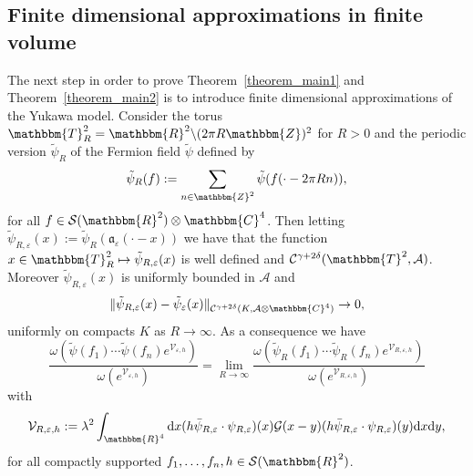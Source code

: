 \documentclass[11pt]{article}
\newcommand{\assign}{:=}
\newcommand{\mathd}{\mathrm{d}}
\begin{document}
\subsection{Finite dimensional approximations in finite
volume}\label{sec:finit-dim-yukawa}

The next step in order to prove Theorem~\ref{theorem_main1} and
Theorem~\ref{theorem_main2} is to introduce finite dimensional approximations
of the Yukawa model. Consider the torus $\mathbbm{T}_R^2 =\mathbbm{R}^2
\backslash (2 \pi R\mathbbm{Z})^2$ for $R > 0$ and the periodic version
$\tilde{\psi}_R$ of the Fermion field $\tilde{\psi}$ defined by
\[ \tilde{\psi}_R (f) \assign \sum_{n \in \mathbbm{Z}^2} \tilde{\psi} (f (\cdot
   - 2 \pi R n)), \]
for all $f \in \mathcal{S} (\mathbbm{R}^2) \otimes \mathbbm{C}^4$. Then letting
$\tilde{\psi}_{R, \varepsilon} (x) \assign \tilde{\psi}_R
(\mathfrak{a}_{\varepsilon} (\cdot - x))$ we have that the function $x \in
\mathbbm{T}^2_R \mapsto \tilde{\psi}_{R, \varepsilon} (x)$ is well defined and
$\mathcal{C}^{\gamma + 2 \delta} (\mathbbm{T}^2, \mathcal{A})$. Moreover
$\tilde{\psi}_{R, \varepsilon} (x)$ is uniformly bounded in $\mathcal{A}$ and
\[ \| \tilde{\psi}_{R, \varepsilon} (x) - \tilde{\psi}_{\varepsilon} (x)
   \|_{\mathcal{C}^{\gamma + 2 \delta} (K, \mathcal{A} \otimes \mathbbm{C}^4)}
   \rightarrow 0, \]
uniformly on compacts $K$ as $R \rightarrow \infty$. As a consequence we have
\begin{equation}
  \frac{\omega (\tilde{\psi} (f_1) \cdots \tilde{\psi} (f_n)
  e^{\mathcal{V}_{\varepsilon, h}})}{\omega (e^{\mathcal{V}_{\varepsilon,
  h}})} = \lim_{R \rightarrow \infty} \frac{\omega (\tilde{\psi}_R (f_1)
  \cdots \tilde{\psi}_R (f_n) e^{\mathcal{V}_{R, \varepsilon, h}})}{\omega
  (e^{\mathcal{V}_{R, \varepsilon, h}})}
  \label{eq:euclidean-yukawa-fermion-periodic}
\end{equation}
with
\[ \mathcal{V}_{R, \varepsilon, h} \assign \lambda^2 \int_{\mathbbm{R}^4}
   \mathd x (h \bar{\psi}_{R, \varepsilon} \cdot \psi_{R, \varepsilon}) (x)
   \mathcal{G} (x - y) (h \bar{\psi}_{R, \varepsilon} \cdot \psi_{R,
   \varepsilon}) (y) \mathd x \mathd y, \]
for all compactly supported $f_1, \ldots, f_n, h \in \mathcal{S}
(\mathbbm{R}^2)$.

\
\end{document}
